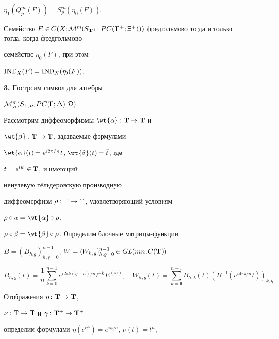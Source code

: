 $\eta _1 (Q_p^m (F))= S_p^m (\eta _0(F))$.





\begin{lem}


Семейство $F\in C(X;{\cal M}^m(S_{{\bold T}^+};\,PC({\bold


T}^+;\Xi^+)))$ фредгольмово тогда и только тогда, когда фредгольмово


семейство $\eta _0(F)$, при этом


$\operatorname{IND}_X(F)=\operatorname{IND}_X(\eta _0(F))$.


\end{lem}








{\bf 3.} Построим символ для алгебры


${\cal M}^m_{\varkappa} (S_{\Gamma, \varkappa},PC(\Gamma;\Delta);{\cal D})$.


Рассмотрим диффеоморфизмы $\wt{\alpha} :{\bold T} \to {\bold T}$ и


$\wt{\beta} :{\bold T} \to {\bold T}$, задаваемые формулами


$\wt{\alpha}(t)=e^{i2\pi/n}t$, $\wt{\beta}(t)=\bar{t}$, где


$t=e^{i\psi}\in{\bold T}$, и имеющий


ненулевую г\"ельдеровскую производную


диффеоморфизм $\rho:\,\Gamma\to{\bold T}$, удовлетворяющий условиям


$\rho\circ\alpha=\wt{\alpha}\circ\rho$,


$\rho\circ\beta=\wt{\beta}\circ\rho$. Определим блочные матрицы-функции


$B=(B_{h,g})_{h,g=0}^{n-1}$, $W=(W_{h,g})_{h,g=0}^{n-1}


\in GL(mn; C({\bold T}))$


$$


B_{h,g}(t)=\frac{1}{n}\sum_{k=0}^{n-1}e^{i2\pi k(g-h)/n}t^{-k}E^{(m)},


\quad W_{h,g}(t)=\sum_{k=0}^{n-1}B_{h,k}(t)


(B^{-1}(e^{i4\pi k/n}\bar{t}))_{k,g}.


$$


Отображения $\eta :{\bold T}\to {\bold T}$,


$\nu : {\bold T}\to {\bold T}$ и $\gamma:{\bold T}^+\to{\bold T}^+$


определим формулами $\eta(e^{i\psi})=e^{i\psi/n}$, $\nu(t)=t^n$,


